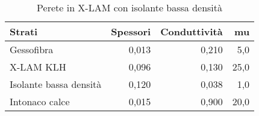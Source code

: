 \begin{table}[H]
\centering
\caption{Perete in X-LAM con isolante bassa densità}
\begin{tabular}{lrrr}
\toprule
                      Strati & Spessori & Conduttività  &    mu \\
\midrule
                  Gessofibra &    0,013 &                0,210 &   5,0 \\
                   X-LAM KLH &    0,096 &                0,130 &  25,0 \\
 Isolante bassa densità  &    0,120 &                0,038 &   1,0 \\
              Intonaco calce &    0,015 &                0,900 &  20,0 \\
\bottomrule
\end{tabular}
\end{table}
